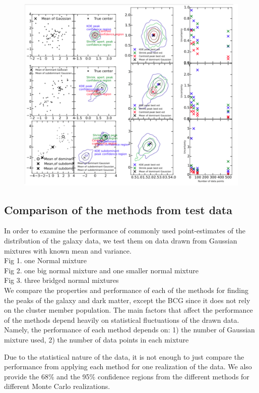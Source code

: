 \documentclass[usenatbib]{mn2e}
\begin{document}
\begin{figure}
	\includegraphics[width=.95\linewidth]{figures/ph_fig_galaxycenter_mixtureTests.pdf}
	\caption{
		\label{fig:config}}
\end{figure}



\subsection{Comparison of the methods from test data}
In order to examine the performance of commonly used point-estimates of the
distribution of the galaxy data, we test them on data drawn from Gaussian mixtures with
known mean and variance. \\
Fig 1. one Normal mixture \\  
Fig 2. one big normal mixture and one smaller normal mixture \\ 
Fig 3. three bridged normal mixtures \\  
We compare the properties and performance of each of the
methods for finding the peaks of the galaxy and dark matter, 
except the BCG since it does not rely on the cluster member population. 
The main factors that affect the performance of the methods depend heavily on
statistical fluctuations of the drawn data. Namely, the performance of each
method depends on: 1) the
number of Gaussian mixture used, 2) the number of data points in each mixture

Due to the statistical nature of the data, it is not enough to just
compare the performance from applying each method for one realization of the
data. We also provide the 68\% and the 95\% confidence regions from the
different methods for different Monte Carlo realizations.
\end{document}
